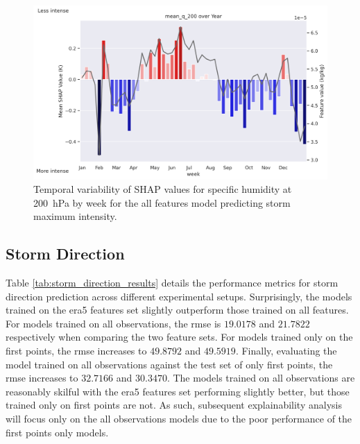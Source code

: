 \begin{figure}[ht]
    \centering
    \includegraphics[width=\textwidth]{../figures/generated/experiments/storm_max_intensity/temporal_corr/storm_max_intensity_all_shap_mean_q_200_by_week_over_year.png}
    \caption{Temporal variability of SHAP values for specific humidity at \SI{200}{\hecto\pascal} by week for the all features model predicting storm maximum intensity.}
    \label{fig:storm_max_intensity_all_shap_mean_q_200_by_week_over_year}
\end{figure}

\clearpage
\subsection{Storm Direction}

Table \ref{tab:storm_direction_results} details the performance metrics for storm direction prediction across different experimental setups. Surprisingly, the models trained on the \acrshort{era5} features set slightly outperform those trained on all features. For models trained on all observations, the \acrshort{rmse} is $19.0178$ and $21.7822$ respectively when comparing the two feature sets. For models trained only on the first points, the \acrshort{rmse} increases to $49.8792$ and $49.5919$. Finally, evaluating the model trained on all observations against the test set of only first points, the \acrshort{rmse} increases to $32.7166$ and $30.3470$. The models trained on all observations are reasonably skilful with the \acrshort{era5} features set performing slightly better, but those trained only on first points are not. As such, subsequent explainability analysis will focus only on the all observations models due to the poor performance of the first points only models.

